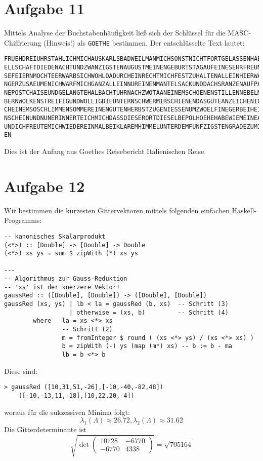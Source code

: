\section*{Aufgabe 11}
Mittels Analyse der Buchstabenhäufigkeit ließ sich der Schlüssel für die
MASC-Chiffrierung (Hinweis!) als \verb/GOETHE/ bestimmen. Der entschlüsselte
Text lautet:
\begin{verbatim}
FRUEHDREIUHRSTAHLICHMICHAUSKARLSBADWEILMANMICHSONSTNICHTFORTGELASSENHAETTEDIEGES
ELLSCHAFTDIEDENACHTUNDZWANZIGSTENAUGUSTMEINENGEBURTSTAGAUFEINESEHRFREUNDLICHEWEI
SEFEIERNMOCHTEERWARBSICHWOHLDADURCHEINRECHTMICHFESTZUHALTENALLEINHIERWARNICHTLAE
NGERZUSAEUMENICHWARFMICHGANZALLEINNUREINENMANTELSACKUNDDACHSRANZENAUFPACKENDINEI
NEPOSTCHAISEUNDGELANGTEHALBACHTUHRNACHZWOTAANEINEMSCHOENENSTILLENNEBELMORGENDIEO
BERNWOLKENSTREIFIGUNDWOLLIGDIEUNTERNSCHWERMIRSCHIENENDASGUTEANZEICHENICHHOFFTENA
CHEINEMSOSCHLIMMENSOMMEREINENGUTENHERBSTZUGENIESSENUMZWOELFINEGERBEIHEISSEMSONNE
NSCHEINUNDNUNERINNERTEICHMICHDASSDIESERORTDIESELBEPOLHOEHEHABEWIEMEINEAATERSTADT
UNDICHFREUTEMICHWIEDEREINMALBEIKLAREMHIMMELUNTERDEMFUNFZIGSTENGRADEZUMITTAGZUESS
EN
\end{verbatim}
Dies ist der Anfang aus Goethes Reisebericht \flqq Italienischen Reise\frqq.

\section*{Aufgabe 12}
Wir bestimmen die kürzesten Gittervektoren mittels folgenden einfachen
Haskell-Programms:
\lstset{language=Haskell}
\begin{lstlisting}
-- kanonisches Skalarprodukt
(<*>) :: [Double] -> [Double] -> Double
(<*>) xs ys = sum $ zipWith (*) xs ys

---
-- Algorithmus zur Gauss-Reduktion
-- 'xs' ist der kuerzere Vektor!
gaussRed :: ([Double], [Double]) -> ([Double], [Double])
gaussRed (xs, ys) | lb < la = gaussRed (b, xs)  -- Schritt (3)
                  | otherwise = (xs, b)         -- Schritt (4)
        where   la = xs <*> xs
                -- Schritt (2)
                m = fromInteger $ round ( (xs <*> ys) / (xs <*> xs) ) 
                b = zipWith (-) ys (map (m*) xs) -- b := b - ma
                lb = b <*> b
\end{lstlisting}
Diese sind:
\begin{lstlisting}
> gaussRed ([10,31,51,-26],[-10,-40,-82,48])
	([-10,-13,11,-18],[10,22,20,-4])
\end{lstlisting}
woraus für die sukzessiven Minima folgt:
\[ \lambda_1(\Lambda) \approx 26.72, \lambda_2(\Lambda) \approx 31.62 \]
Die Gitterdeterminante ist
\[ \sqrt{\det\left(\begin{matrix}10728&-6770\\-6770&4338\end{matrix}\right)} = \sqrt{705164} \]

